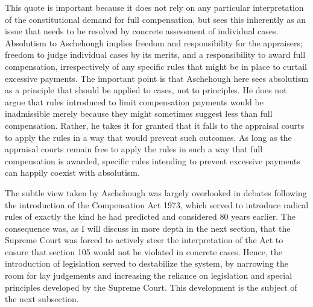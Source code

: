 This quote is important because it does not rely on any particular interpretation of the constitutional demand for full compensation, but sees this inherently as an issue that needs to be resolved by concrete assessment of individual cases. Absolutism to Aschehough implies freedom and responsibility for the appraisers; freedom to judge individual cases by its merits, and a responsibility to award full compensation, irrespectively of any specific rules that might be in place to curtail excessive payments. The important point is that Aschehough here sees absolutism as a principle that should be applied to cases, not to principles. He does not argue that rules introduced to limit compensation payments would be inadmissible merely because they might sometimes suggest less than full compensation. Rather, he takes it for granted that it falls to the appraisal courts to apply the rules in a way that would prevent such outcomes. As long as the appraisal courts remain free to apply the rules in such a way that full compensation is awarded, specific rules intending to prevent excessive payments can happily coexist with absolutism.

The subtle view taken by Aschehough was largely overlooked in debates following the introduction of the Compensation Act 1973, which served to introduce radical rules of exactly the kind he had predicted and considered 80 years earlier. The consequence was, as I will discuss in more depth in the next section, that the Supreme Court was forced to actively steer the interpretation of the Act to ensure that section 105 would not be violated in concrete cases. Hence, the introduction of legislation served to destabilize the system, by narrowing the room for lay judgements and increasing the reliance on legislation and special principles developed by the Supreme Court. This development is the subject of the next subsection.


